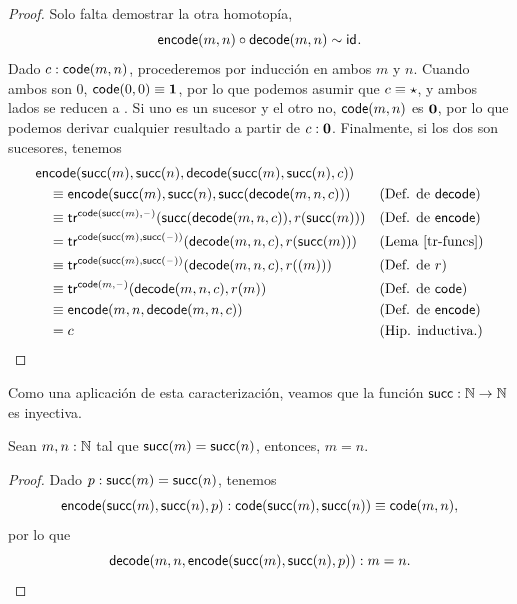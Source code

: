 \documentclass[../main.tex]{subfiles}
\begin{document}
\begin{proof}
  Solo falta demostrar la otra homotop\'ia,
  \[ \mathsf{encode}(m,n) \circ \mathsf{decode}(m,n) \sim \mathsf{id}_{}. \]
  Dado $c: \mathsf{code}(m,n)$, procederemos por inducción en ambos $m$ y $n$.
  Cuando ambos son 0, $\mathsf{code}(0,0)\equiv \mathbf{1}$, por lo que podemos asumir que $c \equiv \star$, y ambos lados se reducen a \star.
  Si uno es un sucesor y el otro no, $\mathsf{code}(m,n)$ es $\mathbf{0}$, por lo que podemos derivar cualquier resultado a partir de $c : \mathbf{0}$.
  Finalmente, si los dos son sucesores, tenemos
  \begin{align*}
    \mathsf{en} & \mathsf{code} (\mathsf{succ}(m), \mathsf{succ}(n),\mathsf{decode}(\mathsf{succ}(m),\mathsf{succ}(n),c))               &  &                              \\
                & \equiv \mathsf{encode}(\mathsf{succ}(m),\mathsf{succ}(n),{\mathsf{succ}}(\mathsf{decode}(m,n,c)))                     &  & \text{(Def. de \ensuremath{\mathsf{decode}})}     \\
                & \equiv \mathsf{tr}^{\mathsf{code}(\mathsf{succ}(m),{\mathord{\hspace{1pt}\text{--}\hspace{1pt}}})}({\mathsf{succ}}(\mathsf{decode}(m,n,c)),r(\mathsf{succ}(m))) &  & \text{(Def. de \ensuremath{\mathsf{encode}})}     \\
                & = \mathsf{tr}^{\mathsf{code}(\mathsf{succ}(m),\mathsf{succ}({\mathord{\hspace{1pt}\text{--}\hspace{1pt}}}))}(\mathsf{decode}(m,n,c),r(\mathsf{succ}(m)))       &  & \text{(Lema \ref{tr-funcs})} \\
                & \equiv \mathsf{tr}^{\mathsf{code}(\mathsf{succ}(m),\mathsf{succ}({\mathord{\hspace{1pt}\text{--}\hspace{1pt}}}))}(\mathsf{decode}(m,n,c),r((m)))       &  & \text{(Def. de $r$)}         \\
                & \equiv \mathsf{tr}^{\mathsf{code}(m,{\mathord{\hspace{1pt}\text{--}\hspace{1pt}}})}(\mathsf{decode}(m,n,c),r(m))                     &  & \text{(Def. de \ensuremath{\mathsf{code}})}       \\
                & \equiv \mathsf{encode}(m,n,\mathsf{decode}(m,n,c))                                         &  & \text{(Def. de \ensuremath{\mathsf{encode}})}     \\
                & = c                                                                       &  & \text{(Hip. inductiva.)}
  \end{align*}
\end{proof}

Como una aplicaci\'on de esta caracterizaci\'on, veamos que la funci\'on $\mathsf{succ}: \mathbb{N} \to \mathbb{N}$ es inyectiva.
\begin{corollary}
  Sean $m,n: \mathbb{N}$ tal que $\mathsf{succ}(m)=\mathsf{succ}(n)$, entonces, $m=n$.
\end{corollary}
\begin{proof}
  Dado $p:\mathsf{succ}(m)=\mathsf{succ}(n)$, tenemos
  \[ \mathsf{encode}(\mathsf{succ}(m),\mathsf{succ}(n),p): \mathsf{code}(\mathsf{succ}(m),\mathsf{succ}(n)) \equiv \mathsf{code}(m,n), \]
  por lo que
  \[ \mathsf{decode}(m, n, \mathsf{encode}(\mathsf{succ}(m),\mathsf{succ}(n),p)) : m=n. \]
\end{proof}
\end{document}
